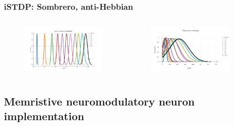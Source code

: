 \documentclass[12pt, aspectratio=169]{beamer}
\begin{document}

\begin{frame}
\frametitle{iSTDP: Sombrero, anti-Hebbian}
\begin{columns}[c] %
\begin{figure}
\includegraphics[width=1\linewidth]{Gauss_Fl_Ia_sombrero}
\end{figure}
\begin{figure}
\includegraphics[width=1\linewidth]{Gauss_Ia_antiHebb}
\end{figure}
\end{columns}
\end{frame}

\subsection{Memristive neuromodulatory neuron implementation}
\end{document}
